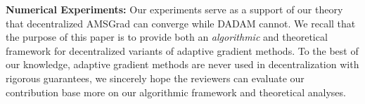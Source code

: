 \documentclass{article}
\begin{document}
\textbf{Numerical Experiments:} 
Our experiments serve as a support of our theory that decentralized AMSGrad can converge while DADAM cannot.
We recall that the purpose of this paper is to provide both an \emph{algorithmic} and {theoretical} framework for decentralized variants of adaptive gradient methods. 
To the best of our knowledge, adaptive gradient methods are never used in decentralization with rigorous guarantees, we sincerely hope the reviewers can evaluate our contribution base more on our algorithmic framework and theoretical analyses.
\end{document}
